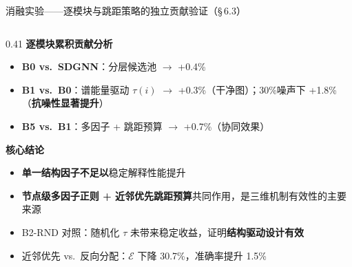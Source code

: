 \documentclass[aspectratio=169,9pt,xcolor=dvipsnames]{beamer}
\newcommand{\highlight}[1]{\textcolor{myred}{\textbf{#1}}}
\newcommand{\blue}[1]{\textcolor{mynavy}{#1}}
\newcommand{\green}[1]{\textcolor{mygreen}{#1}}
\begin{document}
\begin{frame}{消融实验——逐模块与跳距策略的独立贡献验证（§\,6.3）}
\begin{columns}[T]
    \begin{column}{0.41\textwidth}
      \textbf{\blue{逐模块累积贡献分析}}
      \begin{itemize}
        \item \textbf{B0 vs.\ SDGNN}：分层候选池 $\to$ \green{+0.4\%}
        \item \textbf{B1 vs.\ B0}：谱能量驱动 $\tau(i)$ $\to$ \green{+0.3\%}（干净图）；30\%噪声下 \green{+1.8\%}（\textbf{抗噪性显著提升}）
        \item \textbf{B5 vs.\ B1}：多因子 + 跳距预算 $\to$ \green{+0.7\%}（协同效果）
      \end{itemize}

      \vspace{0.2cm}
      \textbf{\highlight{核心结论}}
      \begin{itemize}
        \item \textbf{单一结构因子不足以}稳定解释性能提升
        \item \textbf{节点级多因子正则 + 近邻优先跳距预算}共同作用，是三维机制有效性的主要来源
        \item B2-RND 对照：随机化 $\tau$ 未带来稳定收益，证明\textbf{结构驱动设计有效}
        \item 近邻优先 vs.\ 反向分配：$\mathcal{E}$ 下降 30.7\%，准确率提升 1.5\%
      \end{itemize}
    \end{column}
  \end{columns}
\end{frame}
\end{document}
